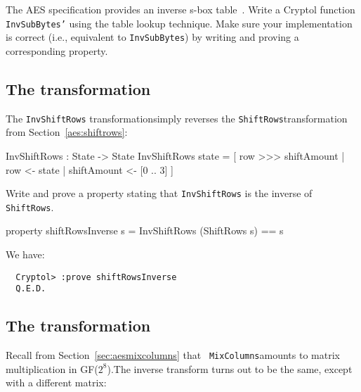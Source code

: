 \begin{Exercise}\label{ex:invsb:3}
  The AES specification provides an inverse s-box table~\cite[Figure
  14, Section 5.3.2]{aes}. Write a Cryptol function {\tt InvSubBytes'}
  using the table lookup technique. Make sure your implementation is
  correct (i.e., equivalent to {\tt InvSubBytes}) by writing and
  proving a corresponding property.
\end{Exercise}

\subsection{The {} transformation}
\label{sec:ttfam-invsh-transf}

The {\tt InvShiftRows} transformation\indAESInvShiftRows simply
reverses the {\tt ShiftRows}\indAESShiftRows transformation from
Section~\ref{aes:shiftrows}:

\begin{code}
  InvShiftRows : State -> State
  InvShiftRows state = [ row >>> shiftAmount 
                       | row <- state
                       | shiftAmount <- [0 .. 3]
                       ]
\end{code}

\begin{Exercise}\label{ex:aesisr:0}
  Write and prove a property stating that {\tt InvShiftRows} is the
  inverse of {\tt ShiftRows}.
\end{Exercise}
\begin{Answer}
\begin{code}
  property shiftRowsInverse s = InvShiftRows (ShiftRows s) == s
\end{code}
We have:
\begin{Verbatim}
  Cryptol> :prove shiftRowsInverse
  Q.E.D.
\end{Verbatim}
\end{Answer}

\subsection{The {} transformation}
\label{sec:ttfam-invm-transf}

Recall from Section~\ref{sec:aesmixcolumns} that {\tt
  MixColumns}\indAESMixColumns amounts to matrix multiplication in
GF($2^8$).\indGF The inverse transform turns out to be the same,
except with a different matrix:\indAESInvMixColumns

